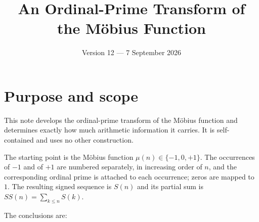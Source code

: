 \documentclass[11pt]{amsart}
\title{An Ordinal-Prime Transform of the M\"obius Function}
\author{}
\date{Version 12 --- 7 September 2026}
\numberwithin{equation}{section}
\theoremstyle{plain}
\theoremstyle{definition}
\theoremstyle{remark}
\newcommand{\mob}{\mu}
\begin{document}
\maketitle
\enlargethispage{2pt}
\tableofcontents

\section{Purpose and scope}
\label{sec:purpose}

This note develops the ordinal-prime transform of the M\"obius function and
determines exactly how much arithmetic information it carries. It is
self-contained and uses no other construction.

The starting point is the M\"obius function $\mob(n)\in\{-1,0,+1\}$. The
occurrences of $-1$ and of $+1$ are numbered separately, in increasing order of
$n$, and the corresponding ordinal prime is attached to each occurrence; zeros
are mapped to $1$. The resulting signed sequence is $S(n)$ and its partial sum
is $SS(n)=\sum_{k\le n}S(k)$.

The conclusions are:
\end{document}
